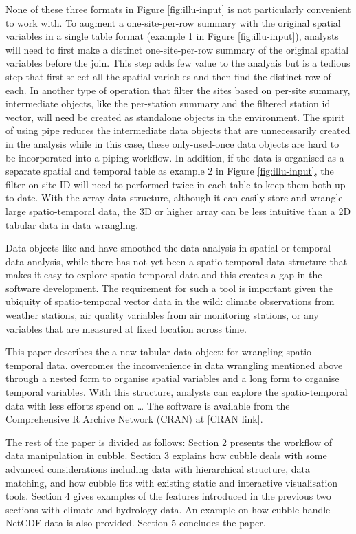 \documentclass[
]{jss}
\begin{document}
None of these three formats in Figure \ref{fig:illu-input} is not
particularly convenient to work with. To augment a one-site-per-row
summary with the original spatial variables in a single table format
(example 1 in Figure \ref{fig:illu-input}), analysts will need to first
make a distinct one-site-per-row summary of the original spatial
variables before the join. This step adds few value to the analyais but
is a tedious step that first select all the spatial variables and then
find the distinct row of each. In another type of operation that filter
the sites based on per-site summary, intermediate objects, like the
per-station summary and the filtered station id vector, will need be
created as standalone objects in the environment. The spirit of using
pipe reduces the intermediate data objects that are unnecessarily
created in the analysis while in this case, these only-used-once data
objects are hard to be incorporated into a piping workflow. In addition,
if the data is organised as a separate spatial and temporal table as
example 2 in Figure \ref{fig:illu-input}, the filter on site ID will
need to performed twice in each table to keep them both up-to-date. With
the array data structure, although it can easily store and wrangle large
spatio-temporal data, the 3D or higher array can be less intuitive than
a 2D tabular data in data wrangling.

Data objects like  \citep{sf} and  \citep{tsibble}
have smoothed the data analysis in spatial or temporal data analysis,
while there has not yet been a spatio-temporal data structure that makes
it easy to explore spatio-temporal data and this creates a gap in the
software development. The requirement for such a tool is important given
the ubiquity of spatio-temporal vector data in the wild: climate
observations from weather stations, air quality variables from air
monitoring stations, or any variables that are measured at fixed
location across time.

This paper describes the a new tabular data object:  for
wrangling spatio-temporal data.  overcomes the inconvenience
in data wrangling mentioned above through a nested form to organise
spatial variables and a long form to organise temporal variables. With
this structure, analysts can explore the spatio-temporal data with less
efforts spend on \ldots{} The software is available from the
Comprehensive R Archive Network (CRAN) at {[}CRAN link{]}.

The rest of the paper is divided as follows: Section 2 presents the
workflow of data manipulation in cubble. Section 3 explains how cubble
deals with some advanced considerations including data with hierarchical
structure, data matching, and how cubble fits with existing static and
interactive visualisation tools. Section 4 gives examples of the
features introduced in the previous two sections with climate and
hydrology data. An example on how cubble handle NetCDF data is also
provided. Section 5 concludes the paper.
\end{document}

